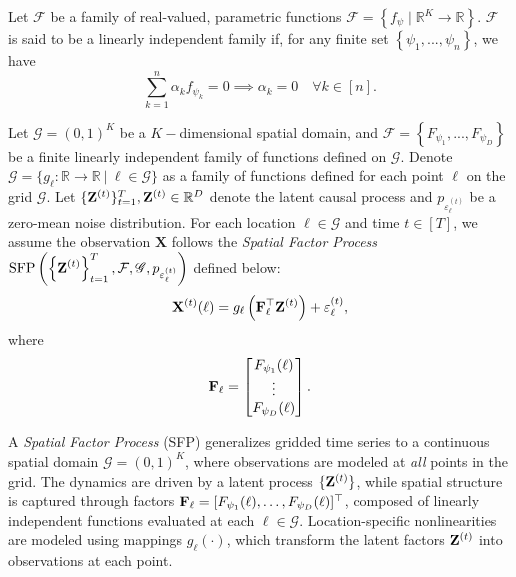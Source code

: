 \setcounter{definition}{-1}
\begin{definition}
    Let $\mathcal{F}$ be a family of real-valued, parametric functions $\mathcal{F} = \left\{ f_\psi \mid \mathbb{R}^{K} \rightarrow \mathbb{R} \right\}$. $\mathcal{F}$ is said to be a linearly independent family if, for any finite set $\left\{ \psi_1, ..., \psi_n \right\}$, we have 
    \begin{equation}
        \sum_{k=1}^n \alpha_k f_{\psi_k} = 0 \implies \alpha_k = 0 \quad \forall k \in [n]. 
    \end{equation}
\end{definition}

\begin{definition}
    \label{def:spatial_factor_process}
    Let $\mathcal{G} = (0,1)^K$ be a $K-$dimensional spatial domain, and $\mathcal{F} = \left\{F_{\psi_1}, ..., F_{\psi_D} \right\}$ be a finite linearly independent family of functions defined on $\mathcal{G}$. Denote $\mathscr{G} = \big\{ g_{\ell} \colon \mathbb{R} \to \mathbb{R} \ \big| \ \ell \in \mathcal{G} \big\}$ as a family of functions defined for each point $\ell$ on the grid $\mathcal{G}$. Let  $\{\mathbf{Z}^{(t)}\}_{t=1}^T, \mathbf{Z}^{(t)} \in \mathbb{R}^D$ denote the latent causal process and  $p_{\varepsilon_{\ell}^{(t)}}$ be a zero-mean noise distribution. For each location $\ell \in \mathcal{G}$  and time $t \in [T]$, we assume the observation $\mathbf{X}$ follows the \textit{Spatial Factor Process} $\displaystyle \text{SFP}\left(\left\{\mathbf{Z}^{(t)}\right\}_{t=1}^T, \mathcal{F}, \mathscr{G}, p_{\varepsilon_{\ell}^{(t)}} \right)$ defined below: 
\begin{equation} \mathbf{X}^{(t)} (\ell) = g_{\ell} \left (\mathbf{F}_{\ell}^\top \mathbf{Z}^{(t)} \right) + \varepsilon_{\ell}^{(t)}, \label{eqn:x_eqn_2}
    \end{equation}
    where
    \begin{equation*}
        \mathbf{F}_{\ell} = \begin{bmatrix}
            F_{\psi_1}(\ell) \\
            \vdots \\
            F_{\psi_D}(\ell)
        \end{bmatrix}.
    \end{equation*}
\end{definition}


A \textit{Spatial Factor Process} (SFP) generalizes gridded time series to a continuous spatial domain $\mathcal{G} = (0,1)^K$, where observations are modeled at \textit{all} points in the grid. The dynamics are driven by a latent process $\{\mathbf{Z}^{(t)}\}$, while spatial structure is captured through factors $\mathbf{F}_{\ell} = [F_{\psi_1}(\ell), \dots, F_{\psi_D}(\ell)]^\top$, composed of linearly independent functions evaluated at each $\ell \in \mathcal{G}$. Location-specific nonlinearities are modeled using mappings $g_{\ell}(\cdot)$, which transform the latent factors $\mathbf{Z}^{(t)}$ into observations at each point.

